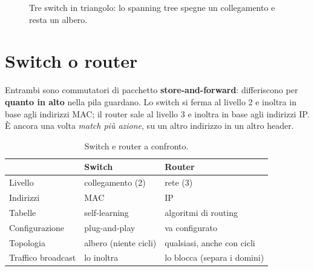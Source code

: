 \begin{figure}[H]
\centering
{}
\caption{Tre switch in triangolo: lo spanning tree spegne un collegamento e resta un albero.}
\end{figure}

\section{Switch o router}

Entrambi sono commutatori di pacchetto \textbf{store-and-forward}: differiscono per \textbf{quanto in alto} nella pila guardano. Lo switch
si ferma al livello 2 e inoltra in base agli indirizzi MAC; il router sale al livello 3 e inoltra in base agli indirizzi IP. È ancora
una volta \emph{match più azione}, su un altro indirizzo in un altro header.

\begin{table}[H]
\centering
\begin{tabular}{p{3.5cm}p{5.2cm}p{5.2cm}}
\toprule
 & \textbf{Switch} & \textbf{Router} \\
\midrule
Livello & collegamento (2) & rete (3) \\
Indirizzi & MAC & IP \\
Tabelle & self-learning & algoritmi di routing \\
Configurazione & plug-and-play & va configurato \\
Topologia & albero (niente cicli) & qualsiasi, anche con cicli \\
Traffico broadcast & lo inoltra & lo blocca (separa i domini) \\
\bottomrule
\end{tabular}
\caption{Switch e router a confronto.}
\end{table}

